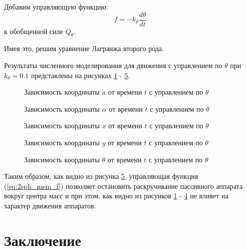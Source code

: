 Добавим управляющую функцию:
\begin{equation*}
\label{eq:2sph_msm_f}
	f = - k_\theta \frac{d\theta}{dt}
\end{equation*}
к обобщенной силе $Q_\theta$.

Имея это, решим уравнение Лагранжа второго рода.

Результаты численного моделирования для движения с управлением по $\theta$ при $k_\theta = 0.1$ представлены на рисунках \ref{ris:2sph_msm_a_full_u} - \ref{ris:2sph_msm_theta_full_u}.

\begin{figure}[H]
	\caption{Зависимость координаты $a$ от времени $t$ с управлением по $\theta$}
	\label{ris:2sph_msm_a_full_u}
\end{figure}
\begin{figure}[H]
	\caption{Зависимость координаты $\alpha$ от времени $t$ с управлением по $\theta$}
	\label{ris:2sph_msm_alpha_full_u}
\end{figure} 
\begin{figure}[H]
	\caption{Зависимость координаты $x$ от времени $t$ с управлением по $\theta$}
	\label{ris:2sph_msm_x_full_u}
\end{figure} 
\begin{figure}[H]
	\caption{Зависимость координаты $y$ от времени $t$ с управлением по $\theta$}
	\label{ris:2sph_msm_y_full_u}
\end{figure} 
\begin{figure}[H]
	\caption{Зависимость координаты $\theta$ от времени $t$ с управлением по $\theta$}
	\label{ris:2sph_msm_theta_full_u}
\end{figure}

Таким образом, как видно из рисунка \ref{ris:2sph_msm_theta_full_u}, управляющая функция (\ref{eq:2sph_msm_f}) позволяет остановить раскручивание пассивного аппарата вокруг центра масс и при этом, как видно из рисунков \ref{ris:2sph_msm_a_full_u} - \ref{ris:2sph_msm_y_full_u} не влияет на характер движения аппаратов.

\section*{Заключение}

